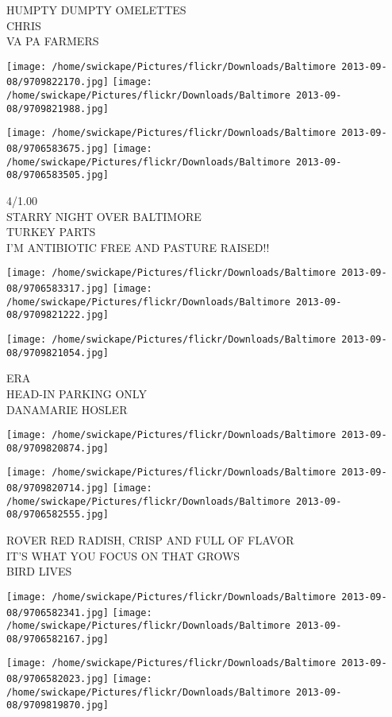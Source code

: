 \documentclass[10pt,letterpaper]{article}
\begin{document}
HUMPTY DUMPTY OMELETTES\\
CHRIS\\
VA PA FARMERS
\pagebreak

\texttt{[image: /home/swickape/Pictures/flickr/Downloads/Baltimore 2013-09-08/9709822170.jpg]}
\texttt{[image: /home/swickape/Pictures/flickr/Downloads/Baltimore 2013-09-08/9709821988.jpg]}

\texttt{[image: /home/swickape/Pictures/flickr/Downloads/Baltimore 2013-09-08/9706583675.jpg]}
\texttt{[image: /home/swickape/Pictures/flickr/Downloads/Baltimore 2013-09-08/9706583505.jpg]}

4/1.00\\
STARRY NIGHT OVER BALTIMORE\\
TURKEY PARTS\\
I'M ANTIBIOTIC FREE AND PASTURE RAISED!!
\pagebreak

\texttt{[image: /home/swickape/Pictures/flickr/Downloads/Baltimore 2013-09-08/9706583317.jpg]}
\texttt{[image: /home/swickape/Pictures/flickr/Downloads/Baltimore 2013-09-08/9709821222.jpg]}

\texttt{[image: /home/swickape/Pictures/flickr/Downloads/Baltimore 2013-09-08/9709821054.jpg]}

ERA\\
HEAD{-}IN PARKING ONLY\\
DANAMARIE HOSLER
\pagebreak

\texttt{[image: /home/swickape/Pictures/flickr/Downloads/Baltimore 2013-09-08/9709820874.jpg]}

\vspace{0.25in}
\texttt{[image: /home/swickape/Pictures/flickr/Downloads/Baltimore 2013-09-08/9709820714.jpg]}
\texttt{[image: /home/swickape/Pictures/flickr/Downloads/Baltimore 2013-09-08/9706582555.jpg]}

ROVER RED RADISH, CRISP AND FULL OF FLAVOR\\
IT'S WHAT YOU FOCUS ON THAT GROWS\\
BIRD LIVES
\pagebreak

\texttt{[image: /home/swickape/Pictures/flickr/Downloads/Baltimore 2013-09-08/9706582341.jpg]}
\texttt{[image: /home/swickape/Pictures/flickr/Downloads/Baltimore 2013-09-08/9706582167.jpg]}

\texttt{[image: /home/swickape/Pictures/flickr/Downloads/Baltimore 2013-09-08/9706582023.jpg]}
\texttt{[image: /home/swickape/Pictures/flickr/Downloads/Baltimore 2013-09-08/9709819870.jpg]}
\end{document}
